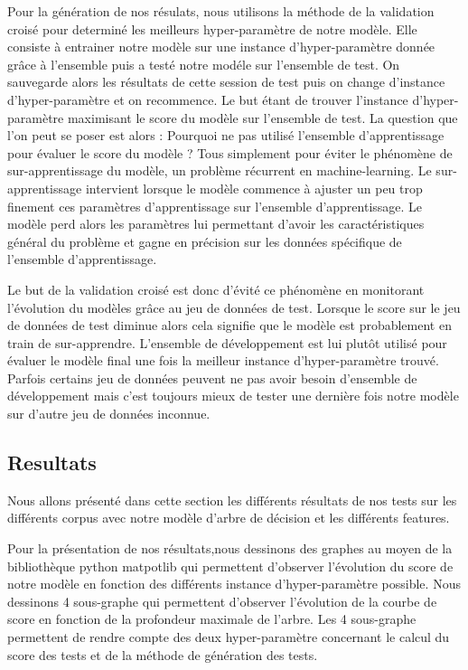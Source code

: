 \documentclass[french, 14pt]{memoir}
\begin{document}
Pour la génération de nos résulats, nous utilisons la méthode de la validation croisé pour determiné les meilleurs hyper-paramètre de notre modèle. Elle consiste à entrainer notre modèle sur une instance d'hyper-paramètre donnée grâce à l'ensemble puis a testé notre modéle sur l'ensemble de test. On sauvegarde alors les résultats de cette session de test puis on change d'instance d'hyper-paramètre et on recommence. Le but étant de trouver l'instance d'hyper-paramètre maximisant le score du modèle sur l'ensemble de test.
La question que l'on peut se poser est alors : Pourquoi ne pas utilisé l'ensemble d'apprentissage pour évaluer le score du modèle ? 
Tous simplement pour éviter le phénomène de sur-apprentissage du modèle, un problème récurrent en machine-learning. Le sur-apprentissage intervient lorsque le modèle commence à ajuster un peu trop finement ces paramètres d'apprentissage sur l'ensemble d'apprentissage. Le modèle perd alors les paramètres lui permettant d'avoir les caractéristiques général du problème et gagne en précision sur les données spécifique de l'ensemble d'apprentissage.

Le but de la validation croisé est donc d'évité ce phénomène en monitorant l'évolution du modèles grâce au jeu de données de test. Lorsque le score sur le jeu de données de test diminue alors cela signifie que le modèle est probablement en train de sur-apprendre. 
L'ensemble de développement est lui plutôt utilisé pour évaluer le modèle final une fois la meilleur instance d'hyper-paramètre trouvé. Parfois certains jeu de données peuvent ne pas avoir besoin d'ensemble de développement mais c'est toujours mieux de tester une dernière fois notre modèle sur d'autre jeu de données inconnue. 

\subsection{Resultats}

Nous allons présenté dans cette section les différents résultats de nos tests sur les différents corpus avec notre modèle d'arbre de décision et les différents features. 

Pour la présentation de nos résultats,nous dessinons des graphes au moyen de la bibliothèque python matpotlib qui permettent d'observer l'évolution du score de notre modèle en fonction des différents instance d'hyper-paramètre possible. Nous dessinons 4 sous-graphe qui permettent d'observer l'évolution de la courbe de score en fonction de la profondeur maximale de l'arbre. Les 4 sous-graphe permettent de rendre compte des deux hyper-paramètre concernant le calcul du score des tests et de la méthode de génération des tests. 
\end{document}
